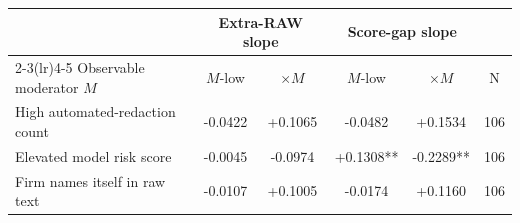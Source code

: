\begin{tabular}{lccccc}
\toprule
& \multicolumn{2}{c}{Extra-RAW slope} & \multicolumn{2}{c}{Score-gap slope} & \\
\cmidrule(lr){2-3}\cmidrule(lr){4-5}
Observable moderator $M$ & $M$-low & $\times M$ & $M$-low & $\times M$ & N \\
\midrule
High automated-redaction count & -0.0422 & +0.1065 & -0.0482 & +0.1534 & 106 \\
Elevated model risk score & -0.0045 & -0.0974 & +0.1308** & -0.2289** & 106 \\
Firm names itself in raw text & -0.0107 & +0.1005 & -0.0174 & +0.1160 & 106 \\
\bottomrule
\end{tabular}